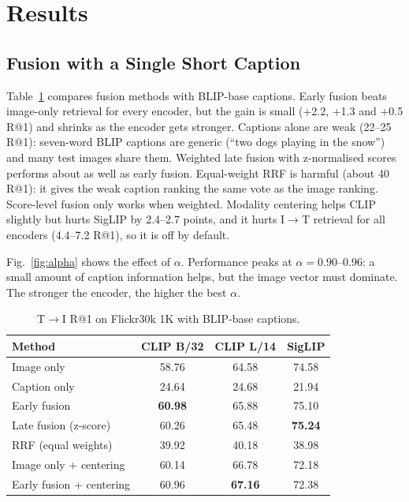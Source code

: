 \documentclass[conference]{IEEEtran}
\newcommand{\RA}{\ensuremath{\rightarrow}}
\newcommand{\best}[1]{\textbf{#1}}
\begin{document}
\section{Results}
\label{sec:results}

\subsection{Fusion with a Single Short Caption}
Table~\ref{tab:part1} compares fusion methods with BLIP-base captions. Early fusion beats image-only
retrieval for every encoder, but the gain is small (+2.2, +1.3 and +0.5 R@1) and shrinks as the encoder gets
stronger. Captions alone are weak (22--25 R@1): seven-word BLIP captions are generic (``two dogs playing
in the snow'') and many test images share them. Weighted late fusion with z-normalised scores performs about
as well as early fusion. Equal-weight RRF is harmful (about 40 R@1): it gives the weak caption ranking the
same vote as the image ranking. Score-level fusion only works when weighted. Modality centering helps CLIP
slightly but hurts SigLIP by 2.4--2.7 points, and it hurts I\RA T retrieval for all encoders (4.4--7.2 R@1),
so it is off by default.

Fig.~\ref{fig:alpha} shows the effect of $\alpha$. Performance peaks at $\alpha=0.90$--$0.96$: a small
amount of caption information helps, but the image vector must dominate. The stronger the encoder, the
higher the best $\alpha$.

\begin{table}[t]
\centering
\caption{T\RA I R@1 on Flickr30k 1K with BLIP-base captions.}
\label{tab:part1}
\setlength{\tabcolsep}{5pt}
\begin{tabular}{lccc}
\toprule
Method & CLIP B/32 & CLIP L/14 & SigLIP \\
\midrule
Image only            & 58.76 & 64.58 & 74.58 \\
Caption only          & 24.64 & 24.68 & 21.94 \\
Early fusion          & \best{60.98} & 65.88 & 75.10 \\
Late fusion (z-score) & 60.26 & 65.48 & \best{75.24} \\
RRF (equal weights)   & 39.92 & 40.18 & 38.98 \\
Image only + centering   & 60.14 & 66.78 & 72.18 \\
Early fusion + centering & 60.96 & \best{67.16} & 72.38 \\
\bottomrule
\end{tabular}
\end{table}
\end{document}
